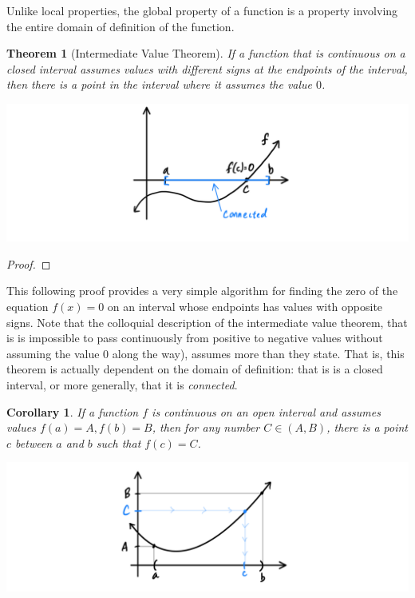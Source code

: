 \documentclass{article}
\newtheorem{theorem}{Theorem}[section]
\newtheorem{corollary}{Corollary}[theorem]
\theoremstyle{remark}
\theoremstyle{definition}
\begin{document}
Unlike local properties, the global property of a function is a property involving the entire domain of definition of the function. 

\begin{theorem}[Intermediate Value Theorem]
If a function that is continuous on a closed interval assumes values with different signs at the endpoints of the interval, then there is a point in the interval where it assumes the value $0$. 
\begin{center}
    \includegraphics[scale=0.3]{img/IVT.PNG}
\end{center}
\end{theorem}
\begin{proof}

\end{proof}

This following proof provides a very simple algorithm for finding the zero of the equation $f(x) = 0$ on an interval whose endpoints has values with opposite signs. 
Note that the colloquial description of the intermediate value theorem, that is is impossible to pass continuously from positive to negative values without assuming the value $0$ along the way), assumes more than they state. That is, this theorem is actually dependent on the domain of definition: that is is a closed interval, or more generally, that it is \textit{connected}. 

\begin{corollary}
If a function $f$ is continuous on an open interval and assumes values $f(a) = A, f(b) = B$, then for any number $C \in (A, B)$, there is a point $c$ between $a$ and $b$ such that $f(c) = C$. 
\begin{center}
    \includegraphics[scale=0.3]{img/Corollary_of_IVT.PNG}
\end{center}
\end{corollary}
\end{document}
